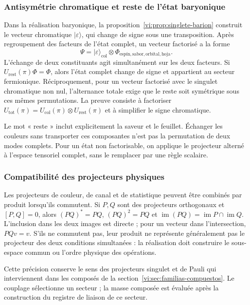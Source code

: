 \subsubsection{Antisymétrie chromatique et reste de l’état baryonique}

Dans la réalisation baryonique, la
proposition~\ref{vi:prop:singlete-barion} construit le vecteur
chromatique \(|\varepsilon\rangle\), qui change de signe
sous une transposition. Après regroupement des facteurs de l’état
complet, un vecteur factorisé a la forme
\[
 \Psi=|\varepsilon\rangle_{\mathrm{col}}
 \otimes\Phi_{\mathrm{espín,sabor,orbital,hoja}}.
\]
L’échange de deux constituants agit simultanément
sur les deux facteurs. Si \(U_{\mathrm{rest}}(\pi)\Phi=\Phi\),
alors l’état complet change de signe et appartient au
secteur fermionique. Réciproquement, pour un vecteur factorisé
avec le singulet chromatique non nul, l’alternance totale exige
que le reste soit symétrique sous ces mêmes permutations.
La preuve consiste à factoriser
\(U_{\mathrm{tot}}(\pi)=U_{\mathrm{col}}(\pi)\otimes
U_{\mathrm{rest}}(\pi)\) et à simplifier le signe chromatique.

Le mot « reste » inclut explicitement la saveur et le feuillet.
Échanger les couleurs sans transporter ces composantes n’est pas
la permutation de deux modes complets. Pour un état non
factorisable, on applique le projecteur alterné à l’espace
tensoriel complet, sans le remplacer par une règle scalaire.

\subsubsection{Compatibilité des projecteurs physiques}

Les projecteurs de couleur, de canal et de statistique peuvent être combinés
par produit lorsqu’ils commutent. Si \(P,Q\) sont des projecteurs
orthogonaux et \([P,Q]=0\), alors
\((PQ)^*=PQ\), \((PQ)^2=PQ\) et
\(\operatorname{im}(PQ)=\operatorname{im}P\cap\operatorname{im}Q\).
L’inclusion dans les deux images est directe ; pour un vecteur
dans l’intersection, \(PQv=v\). S’ils ne commutent pas, leur produit
ne représente généralement pas le projecteur des deux conditions
simultanées : la réalisation doit construire le sous-espace
commun ou l’ordre physique des opérations.

Cette précision conserve le sens des projecteurs
singulet et de Pauli qui interviennent dans les composés de la
section~\ref{vi:sec:familias-compuestos}. Le couplage
sélectionne un secteur ; la masse composée est évaluée après
la construction du registre de liaison de ce secteur.

